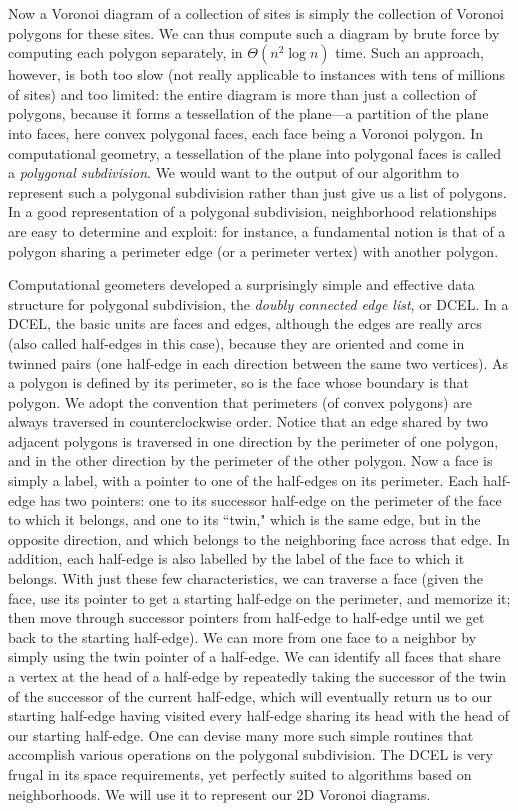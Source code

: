\documentclass[11pt]{article}
\begin{document}
Now a Voronoi diagram of a collection of sites is simply
the collection of Voronoi polygons for these sites.  We can thus compute
such a diagram by brute force by computing each polygon separately,
in $\Theta(n^2 \log n)$ time.  Such an approach, however, is both too slow
(not really applicable to instances with tens of millions of sites) and
too limited: the entire diagram is more than just a collection of polygons,
because it forms a tessellation of the plane---a partition of the plane
into faces, here convex polygonal faces, each face being a Voronoi polygon.
In computational geometry, a tessellation of the plane into polygonal faces
is called a \emph{polygonal subdivision}.
We would want to the output of our algorithm to represent such a polygonal
subdivision rather than just give us a list of polygons.   In a good
representation of a polygonal subdivision, neighborhood relationships are
easy to determine and exploit: for instance, a fundamental notion is that
of a polygon sharing a perimeter edge (or a perimeter vertex) with another
polygon.

Computational geometers developed a surprisingly simple and effective
data structure for polygonal subdivision, the \emph{doubly connected
edge list}, or DCEL.  In a DCEL, the basic units are faces and edges,
although the edges are really arcs (also called half-edges in this case),
because they are oriented and come in twinned pairs (one half-edge in
each direction between the same two vertices).  As a polygon is defined
by its perimeter, so is the face whose boundary is that polygon.  We
adopt the convention that perimeters (of convex polygons) are always
traversed in counterclockwise order.  Notice that an edge shared by
two adjacent polygons is traversed in one direction by the perimeter of
one polygon, and in the other direction by the perimeter of the other
polygon.  Now a face is simply a label, with a pointer to one of the
half-edges on its perimeter.  Each half-edge has two pointers: one to
its successor
half-edge on the perimeter of the face to which it belongs, and one
to its ``twin," which is the same edge, but in the opposite direction,
and which belongs to the neighboring face across that edge.
In addition, each half-edge is also labelled by the label of the face
to which it belongs.
With just these few characteristics, we can traverse a face (given the face,
use its pointer to get a starting half-edge on the perimeter, and memorize it;
then move through successor pointers from half-edge to half-edge until we get
back to the starting half-edge).  We can more from one face to a neighbor
by simply using the twin pointer of a half-edge.  We can identify all
faces that share a vertex at the head of a half-edge by repeatedly taking the
successor of the twin of the successor of the current half-edge,
which will eventually return us to our starting half-edge having visited every
half-edge sharing its head with the head of our starting half-edge.
One can devise many more such simple routines that accomplish various
operations on the polygonal subdivision.  The DCEL is very frugal in its
space requirements, yet perfectly suited to algorithms based on neighborhoods.
We will use it to represent our 2D Voronoi diagrams.
\end{document}
